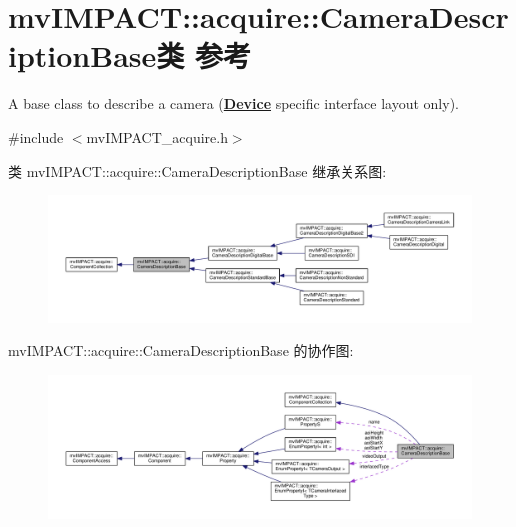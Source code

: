 \hypertarget{classmv_i_m_p_a_c_t_1_1acquire_1_1_camera_description_base}{\section{mv\+I\+M\+P\+A\+C\+T\+:\+:acquire\+:\+:Camera\+Description\+Base类 参考}
\label{classmv_i_m_p_a_c_t_1_1acquire_1_1_camera_description_base}
}


A base class to describe a camera ({\bfseries \hyperlink{classmv_i_m_p_a_c_t_1_1acquire_1_1_device}{Device}} specific interface layout only).  




{\ttfamily \#include $<$mv\+I\+M\+P\+A\+C\+T\+\_\+acquire.\+h$>$}



类 mv\+I\+M\+P\+A\+C\+T\+:\+:acquire\+:\+:Camera\+Description\+Base 继承关系图\+:
\nopagebreak
\begin{figure}[H]
\begin{center}
\leavevmode
\includegraphics[width=350pt]{classmv_i_m_p_a_c_t_1_1acquire_1_1_camera_description_base__inherit__graph}
\end{center}
\end{figure}


mv\+I\+M\+P\+A\+C\+T\+:\+:acquire\+:\+:Camera\+Description\+Base 的协作图\+:
\nopagebreak
\begin{figure}[H]
\begin{center}
\leavevmode
\includegraphics[width=350pt]{classmv_i_m_p_a_c_t_1_1acquire_1_1_camera_description_base__coll__graph}
\end{center}
\end{figure}
